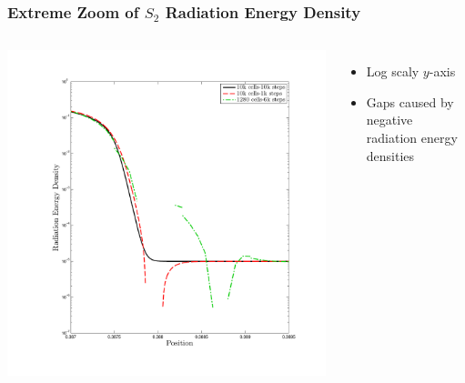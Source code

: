 \documentclass{beamer}
\begin{document}
\begin{frame}
\frametitle{Extreme Zoom of $S_2$ Radiation Energy Density}
\begin{columns}[t]
\includegraphics[height=0.8\textheight,trim=1.0in  0.75in 1.0in 1.0in,clip=true]{../chapter6_grey_radtran/Dissertation_Data/Zoom_10k_Phi.pdf}
\begin{itemize}
\item Log scaly $y$-axis
\item Gaps caused by negative radiation energy densities
\end{itemize}
\end{columns}
\end{frame}
\end{document}
